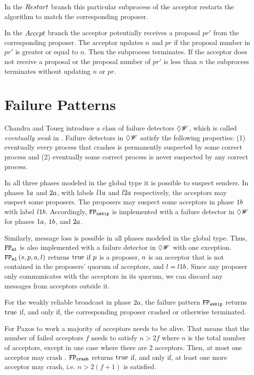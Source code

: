 In the $\mathnormal{Restart}$ branch this particular subprocess of the acceptor restarts the algorithm to match the corresponding proposer.

In the $\mathnormal{Accept}$ branch the acceptor potentially receives a proposal $pr'$ from the corresponding proposer.
The acceptor updates $n$ and $pr$ if the proposal number in $pr'$ is greater or equal to $n$.
Then the subprocess terminates.
If the acceptor does not receive a proposal or the proposal number of $pr'$ is less than $n$ the subprocess terminates without updating $n$ or $pr$.

\section{Failure Patterns}
Chandra and Toueg introduce a class of failure detectors $\Diamond\mathscr{W}$, which is called \emph{eventually weak} in \cite{failure_detectors}.
Failure detectors in $\Diamond\mathscr{W}$ satisfy the following properties: (1) eventually every process that crashes is permanently suspected by some correct process and (2) eventually some correct process is never suspected by any correct process.

In all three phases modeled in the global type it is possible to suspect senders.
In phases $1a$ and $2a$, with labels $l1a$ and $l2a$ respectively, the acceptors may suspect some proposers.
The proposers may suspect some acceptors in phase $1b$ with label $l1b$.
Accordingly, $\mathtt{FP_{uskip}}$ is implemented with a failure detector in $\Diamond\mathscr{W}$ for phases $1a$, $1b$, and $2a$.

Similarly, message loss is possible in all phases modeled in the global type.
Thus, $\mathtt{FP_{ml}}$ is also implemented with a failure detector in $\Diamond\mathscr{W}$ with one exception.
$\mathtt{FP_{ml}}\left(s,p,a,l\right)$ returns $\operatorname{true}$ if $p$ is a proposer, $a$ is an acceptor that is not contained in the proposers' quorum of acceptors, and $l = l1b$.
Since any proposer only communicates with the acceptors in its quorum, we can discard any messages from acceptors outside it.

For the weakly reliable broadcast in phase $2a$, the failure pattern $\mathtt{FP_{wskip}}$ returns $\operatorname{true}$ if, and only if, the corresponding proposer crashed or otherwise terminated.

For Paxos to work a majority of acceptors needs to be alive.
That means that the number of failed acceptors $f$ needs to satisfy $n > 2f$ where $n$ is the total number of acceptors, except in one case where there are 2 acceptors.
Then, at most one acceptor may crash \cite{lower_bounds}.
$\mathtt{FP_{crash}}$ returns $\operatorname{true}$ if, and only if, at least one more acceptor may crash, i.e. $n > 2(f + 1)$ is satisfied.

